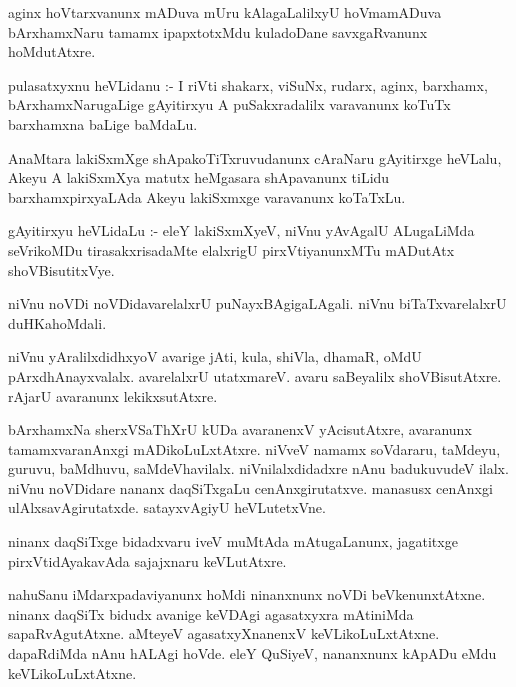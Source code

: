 \documentclass{article}
\begin{document}
\begin{mn}
aginx hoVtarxvanunx  mADuva  mUru kAlagaLalilxyU  hoVmamADuva  bArxhamxNaru  
tamamx  ipapxtotxMdu  kuladoDane  savxgaRvanunx  hoMdutAtxre.
\end{mn}

\begin{mn}
pulasatxyxnu  heVLidanu :- I riVti  shakarx,  viSuNx,  rudarx,  aginx,  barxhamx,  bArxhamxNarugaLige  
gAyitirxyu  A  puSakxradalilx  varavanunx  koTuTx  barxhamxna  baLige  baMdaLu.
\end{mn}

\begin{mn}
AnaMtara  lakiSxmXge  shApakoTiTxruvudanunx  cAraNaru  gAyitirxge  heVLalu,  Akeyu A  lakiSxmXya  matutx  
heMgasara  shApavanunx  tiLidu  barxhamxpirxyaLAda  Akeyu  lakiSxmxge  varavanunx  koTaTxLu.
\end{mn}

\begin{mn}
gAyitirxyu  heVLidaLu :- eleY  lakiSxmXyeV,  niVnu  yAvAgalU  ALugaLiMda  
seVrikoMDu  tirasakxrisadaMte  elalxrigU  pirxVtiyanunxMTu mADutAtx  shoVBisutitxVye.
\end{mn}

\begin{mn}
niVnu noVDi  noVDidavarelalxrU  puNayxBAgigaLAgali.  niVnu  biTaTxvarelalxrU  duHKahoMdali.
\end{mn}

\begin{mn}
niVnu  yAralilxdidhxyoV  avarige jAti,  kula,  shiVla,  dhamaR,  oMdU  pArxdhAnayxvalalx.  
avarelalxrU  utatxmareV.  avaru saBeyalilx shoVBisutAtxre.  rAjarU avaranunx  lekikxsutAtxre.
\end{mn}

\begin{mn}
bArxhamxNa sherxVSaThXrU  kUDa  avaranenxV  yAcisutAtxre,  avaranunx  tamamxvaranAnxgi  
mADikoLuLxtAtxre.  niVveV  namamx  soVdararu,  taMdeyu,  guruvu,  baMdhuvu,  saMdeVhavilalx.  
niVnilalxdidadxre  nAnu  badukuvudeV  ilalx.  niVnu  noVDidare  nananx  daqSiTxgaLu  
cenAnxgirutatxve.  manasusx cenAnxgi ulAlxsavAgirutatxde.  satayxvAgiyU heVLutetxVne.
\end{mn}

\begin{mn}
ninanx daqSiTxge  bidadxvaru  iveV  muMtAda  mAtugaLanunx,  jagatitxge  pirxVtidAyakavAda  sajajxnaru  keVLutAtxre.
\end{mn}

\begin{mn}
nahuSanu  iMdarxpadaviyanunx  hoMdi ninanxnunx  noVDi beVkenunxtAtxne.  ninanx  daqSiTx  bidudx  
avanige  keVDAgi  agasatxyxra  mAtiniMda  sapaRvAgutAtxne.  aMteyeV  agasatxyXnanenxV keVLikoLuLxtAtxne.  
dapaRdiMda  nAnu  hALAgi  hoVde.  eleY  QuSiyeV,  nananxnunx  kApADu  eMdu keVLikoLuLxtAtxne.
\end{mn}
\end{document}
